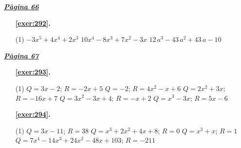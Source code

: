  \vspace{1cm} 
 

\vspace{0.3cm}


\hyperlink{page.66}{\textbf{\em Pàgina 66}}
\begin{enumerate}



 \item[\fontfamily{phv}\selectfont\color{blue}\textbf{\ref{exer:292}. }] \label{ans:292}
 \begin{tasks}[column-sep=1em, item-indent=1.3333em](1)
	 \task $-3x^5+4x^4+2x^3$
	 \task $10x^4-8x^3+7x^2-3x$
	 \task $12\,a^3-43\,a^2+43\,a-10$
\end{tasks}
 \end{enumerate}
\vspace{0.3cm}


\hyperlink{page.67}{\textbf{\em Pàgina 67}}
\begin{enumerate}



 \item[\fontfamily{phv}\selectfont\color{blue}\textbf{\ref{exer:293}. }] \label{ans:293}
 \begin{tasks}[column-sep=1em, item-indent=1.3333em](1)
	 \task $Q=3x-2$; $R=-2x+5$
	 \task $Q=-2$; $R=4x^2-x+6$
	 \task $Q=2x^2+3x$; $R=-16x+7$
	 \task $Q=3x^2-3x+4$; $R=-x+2$
	 \task $Q=x^3-3x$; $R=5x-6$
\end{tasks}
 \end{enumerate}
\begin{enumerate}



 \item[\fontfamily{phv}\selectfont\color{blue}\textbf{\ref{exer:294}. }] \label{ans:294}
 \begin{tasks}[column-sep=1em, item-indent=1.3333em](1)
	 \task $Q=3x-11$; $R=38$
	 \task $Q=x^3+2x^2+4x+8$; $R=0$
	 \task $Q=x^3+x$; $R=1$
	 \task* $Q=7x^4-14x^3+24x^2-48x+103$; $R=-211$
\end{tasks}
 \end{enumerate}
\vspace{0.3cm}

